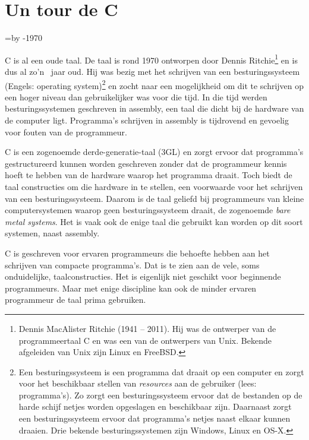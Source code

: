 \chapter{Un tour de C}
\label{cha:tour}
\thispagestyle{empty}

\newcount\cdifference\cdifference=\the\year\advance\cdifference by -1970

C is al een oude taal. De taal is rond 1970 ontworpen door Dennis Ritchie\footnote{Dennis MacAlister Ritchie (1941 -- 2011). Hij was de ontwerper van de programmeertaal C en was een van de ontwerpers van Unix. Bekende afgeleiden van Unix zijn Linux en FreeBSD.} en is dus al zo'n \the\cdifference\ jaar oud. Hij was bezig met het schrijven van een besturingssysteem (Engels: operating system)\footnote{Een besturingssysteem is een programma dat draait op een computer en zorgt voor het beschikbaar stellen van \textsl{resources} aan de gebruiker (lees: programma's). Zo zorgt een besturingssysteem ervoor dat de bestanden op de harde schijf netjes worden opgeslagen en beschikbaar zijn. Daarnaast zorgt een besturingssysteem ervoor dat programma's netjes naast elkaar kunnen draaien. Drie bekende besturingssystemen zijn Windows, Linux en OS-X.} en zocht naar een mogelijkheid om dit te schrijven op een hoger niveau dan gebruikelijker was voor die tijd. In die tijd werden besturingssystemen geschreven in assembly, een taal die dicht bij de hardware van de computer ligt. Programma's schrijven in assembly is tijdrovend en gevoelig voor fouten van de programmeur.

C is een zogenoemde derde-generatie-taal (3GL) en zorgt ervoor dat programma's gestructureerd kunnen worden geschreven zonder dat de programmeur kennis hoeft te hebben van de hardware waarop het programma draait. Toch biedt de taal constructies om die hardware in te stellen, een voorwaarde voor het schrijven van een besturingssysteem. Daarom is de taal geliefd bij programmeurs van kleine computersystemen waarop geen besturingssysteem draait, de zogenoemde \textsl{bare metal systems}. Het is vaak ook de enige taal die gebruikt kan worden op dit soort systemen, naast assembly.

C is geschreven voor ervaren programmeurs die behoefte hebben aan het schrijven van compacte programma's. Dat is te zien aan de vele, soms onduidelijke, taalconstructies. Het is eigenlijk niet geschikt voor beginnende programmeurs. 
Maar met enige discipline kan ook de minder ervaren programmeur de taal prima gebruiken.

